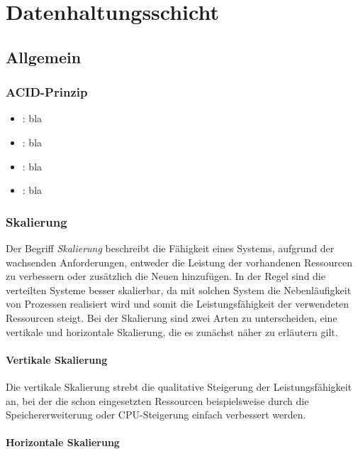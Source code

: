 \chapter{Datenhaltungsschicht}

\section{Allgemein}

\subsection{ACID-Prinzip}

\begin{itemize}

\item \Acid: bla
\item \aCid: bla
\item \acId: bla
\item \aciD: bla

\end{itemize}

\subsection{Skalierung} 

Der Begriff \textit{Skalierung} beschreibt die Fähigkeit eines Systems,  aufgrund der wachsenden Anforderungen, entweder die Leistung der vorhandenen Ressourcen zu verbessern oder zusätzlich die Neuen hinzufügen. In der Regel sind die verteilten Systeme besser skalierbar, da mit solchen System die Nebenläufigkeit von Prozessen realisiert wird und somit die Leistungsfähigkeit der verwendeten Ressourcen steigt.
Bei der Skalierung sind zwei Arten zu unterscheiden, eine vertikale und horizontale Skalierung, die es zunächst näher zu erläutern gilt.

\subsubsection{Vertikale Skalierung}
Die vertikale Skalierung strebt die qualitative Steigerung der Leistungsfähigkeit an, bei der die schon eingesetzten Ressourcen beispielsweise durch die Speichererweiterung oder CPU-Steigerung einfach verbessert werden.

\subsubsection{Horizontale Skalierung}

